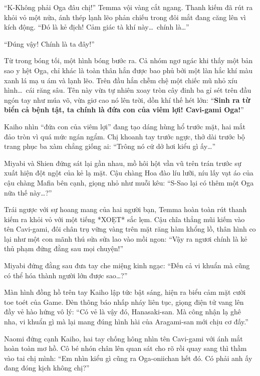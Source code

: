 \documentclass[../main.tex]{subfiles}
\begin{document}
``K-Không phải Oga đâu chị!'' Temma vội vàng cắt ngang. Thanh kiếm đã rút ra khỏi vỏ một nửa, ánh thép lạnh lẽo phản chiếu trong đôi mắt đang căng lên vì kích động. ``Đó là kẻ địch! Cảm giác tà khí này\dots\ chính là\dots''

``Đúng vậy! Chính là ta đây!''

Từ trong bóng tối, một hình bóng bước ra. Cả nhóm ngơ ngác khi thấy một bản sao y hệt Oga, chỉ khác là toàn thân hắn được bao phủ bởi một làn hắc khí màu xanh lá mạ u ám và lạnh lẽo. Trên đầu hắn chễm chệ một chiếc mũ nhỏ xíu hình\dots\ cái răng sâu. Tên này vừa tự nhiên xoay tròn cây đinh ba gỉ sét trên đầu ngón tay như múa võ, vừa giơ cao nó lên trời, dồn khí thế hét lớn: ``\textbf{Sinh ra từ biển cả bệnh tật, ta chính là đứa con của viêm lợi! Cavi-gami Oga!}''


Kaiho nhìn ``đứa con của viêm lợi'' đang tạo dáng hùng hổ trước mặt, hai mắt đảo tròn vì quá mức ngán ngẩm. Chị khoanh tay trước ngực, thở dài trước bộ trang phục ba xàm chẳng giống ai: ``Trông nó cứ dở hơi kiểu gì ấy\dots''

Miyabi và Shien đứng sát lại gần nhau, mồ hôi hột vần vũ trên trán trước sự xuất hiện đột ngột của kẻ lạ mặt. Cậu chàng Hoa đào líu lưỡi, níu lấy vạt áo của cậu chàng Mafia bên cạnh, giọng nhỏ như muỗi kêu: ``S-Sao lại có thêm một Oga nữa thế này\dots?''

Trái ngược với sự hoang mang của hai người bạn, Temma hoàn toàn rút thanh kiếm ra khỏi vỏ với một tiếng *XOẸT* sắc lẹm. Cậu chĩa thẳng mũi kiếm vào tên Cavi-gami, đôi chân trụ vững vàng trên mặt răng hàm khổng lồ, thân hình co lại như một con mãnh thú sửa sửa lao vào mồi ngon: ``Vậy ra ngươi chính là kẻ thủ phạm đứng đằng sau mọi chuyện!''

Miyabi đứng đằng sau đưa tay che miệng kinh ngạc: ``Đến cả vi khuẩn mà cũng có thể hóa thành người lớn được sao\dots?''

Màn hình đồng hồ trên tay Kaiho lập tức bật sáng, hiện ra biểu cảm mặt cười toe toét của Game. Đèn thông báo nhấp nháy liên tục, giọng điện tử vang lên đầy vẻ hào hứng vô lý: ``Có vẻ là vậy đó, Hanasaki-san. Mà công nhận lạ ghê nha, vi khuẩn gì mà lại mang đúng hình hài của Aragami-san mới chịu cơ đấy.''

Naomi đứng cạnh Kaiho, hai tay chống hông nhìn tên Cavi-gami với ánh mắt hoàn toàn mơ hồ. Cô bé nhón chân lên quan sát cho rõ rồi quay sang thì thầm vào tai chị mình: ``Em nhìn kiểu gì cũng ra Oga-oniichan hết đó. Có phải anh ấy đang đóng kịch không chị?''
\end{document}
